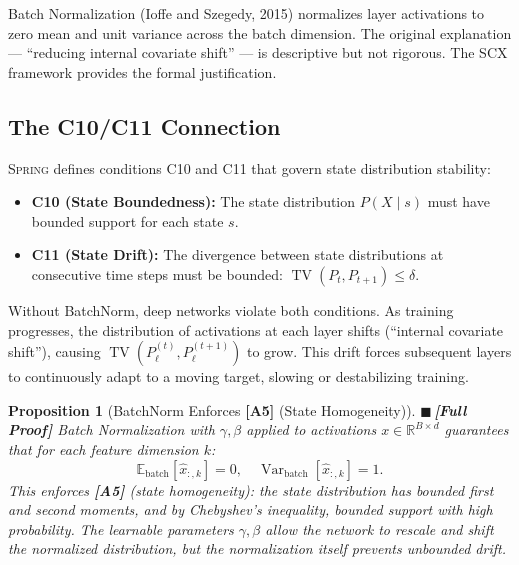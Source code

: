 \documentclass[12pt,a4paper]{article}
\newtheorem{proposition}[theorem]{Proposition}
\theoremstyle{definition}
\newcommand{\rigorFull}{{\color{rigorcolor}$\blacksquare$\,\textbf{[Full Proof]}}}
\newcommand{\Spring}{\textsc{Spring}}
\newcommand{\SCX}{\textsc{SCX}}
\DeclareMathOperator{\TV}{TV}
\DeclareMathOperator{\Var}{Var}
\newcommand{\R}{\mathbb{R}}
\newcommand{\E}{\mathbb{E}}
\newcommand{\asmTag}[1]{\textsf{\textbf{[A#1]}}}
\begin{document}
Batch Normalization (Ioffe and Szegedy, 2015) normalizes layer activations to zero mean and unit variance across the batch dimension. The original explanation — ``reducing internal covariate shift'' — is descriptive but not rigorous. The \SCX{} framework provides the formal justification.

\subsection{The C10/C11 Connection}

\Spring{} defines conditions C10 and C11 that govern state distribution stability:
\begin{itemize}[nosep]
    \item \textbf{C10 (State Boundedness):} The state distribution $P(X \mid s)$ must have bounded support for each state $s$.
    \item \textbf{C11 (State Drift):} The divergence between state distributions at consecutive time steps must be bounded: $\TV(P_t, P_{t+1}) \le \delta$.
\end{itemize}

Without BatchNorm, deep networks violate both conditions. As training progresses, the distribution of activations at each layer shifts (``internal covariate shift''), causing $\TV(P_\ell^{(t)}, P_\ell^{(t+1)})$ to grow. This drift forces subsequent layers to continuously adapt to a moving target, slowing or destabilizing training.

\begin{proposition}[BatchNorm Enforces \asmTag{5} (State Homogeneity)]\label{prop:bn_homogeneity}
\rigorFull
Batch Normalization with $\gamma, \beta$ applied to activations $x \in \R^{B \times d}$ guarantees that for each feature dimension $k$:
\begin{equation}\label{eq:bn_moments}
    \E_{\text{batch}}[\hat{x}_{:,k}] = 0, \quad \Var_{\text{batch}}[\hat{x}_{:,k}] = 1.
\end{equation}
This enforces \asmTag{5} (state homogeneity): the state distribution has bounded first and second moments, and by Chebyshev's inequality, bounded support with high probability. The learnable parameters $\gamma, \beta$ allow the network to rescale and shift the normalized distribution, but the normalization itself prevents unbounded drift.
\end{proposition}
\end{document}
